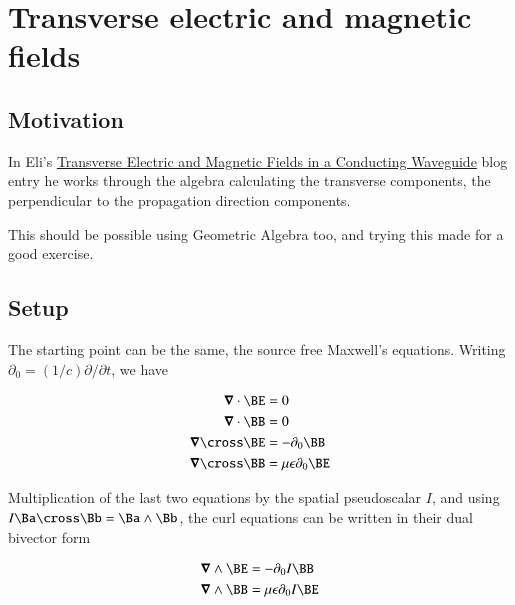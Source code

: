 

\chapter{Transverse electric and magnetic fields}
\label{chap:transverseField}
{}
\date{July 30, 2009}

\beginArtWithToc

\section{Motivation}

In Eli's \href{http://behindtheguesses.blogspot.com/2009/07/transverse-electric-and-magnetic-fields.html}{Transverse Electric and Magnetic Fields in a Conducting Waveguide} blog entry he works through the algebra calculating the transverse components, the perpendicular to the propagation direction components.

This should be possible using Geometric Algebra too, and trying this made for a good exercise.

\section{Setup}

The starting point can be the same, the source free Maxwell's equations.  Writing $\partial_0 = (1/c) \partial/{\partial t}$, we have

\begin{align}\label{eqn:blah1}
\spacegrad \cdot \BE &= 0 \\
\spacegrad \cdot \BB &= 0 \\
\spacegrad \cross \BE &= - \partial_0 \BB \\
\spacegrad \cross \BB &= \mu \epsilon \partial_0 \BE
\end{align}

Multiplication of the last two equations by the spatial pseudoscalar $I$, and using $I \Ba \cross \Bb = \Ba \wedge \Bb$, the curl equations can be written in their dual bivector form

\begin{align}\label{eqn:blah2}
\spacegrad \wedge \BE &= - \partial_0 I \BB \\
\spacegrad \wedge \BB &= \mu \epsilon \partial_0 I \BE
\end{align}

